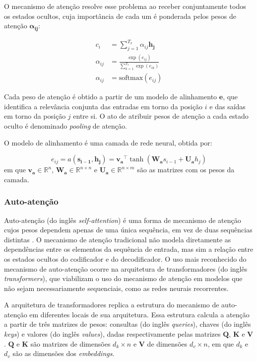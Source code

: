 O mecanismo de atenção \cite{bahdanau2016neural} resolve esse problema ao
receber conjuntamente todos os estados ocultos, cuja importância de cada um é
ponderada pelos pesos de atenção $\mathbf{\alpha_{ij}}$:


\begin{align}
    c_i &= \sum_{j=1}^{T_x} \alpha_{ij} \mathbf{h_j} \\
    \alpha_{ij} &= \frac{\exp(e_{ij})}{\sum_{k=1}^{T_x} \exp(e_{ik})} \\
    \alpha_{ij} &=  \text{softmax}(e_{ij})
\end{align}

Cada peso de atenção é obtido a partir de um modelo de alinhamento $\mathbf{e}$,
que identifica a relevância conjunta das entradas em torno da posição $i$ e das
saídas em torno da posição $j$ entre si. O ato de atribuir pesos de atenção a
cada estado oculto é denominado \textit{pooling} de atenção.

O modelo de alinhamento é uma camada de
rede neural, obtida por:

\begin{equation}
    e_{ij} = a(\mathbf{s_{i-1}}, \mathbf{h_j}) = \mathbf{v_a}^\top \tanh(\mathbf{W_a}s_{i-1} + \mathbf{U_a}h_j)
\end{equation}
em que $\mathbf{v_a} \in \mathbb{R}^n$, $\mathbf{W_a} \in \mathbb{R}^{n \times
n}$ e $\mathbf{U_a} \in \mathbb{R}^{n \times m}$ são as matrizes com os pesos da
camada.

\subsubsection{Auto-atenção}
Auto-atenção (do inglês \textit{self-attention}) é uma forma de mecanismo de
atenção cujos pesos dependem apenas de uma única sequência, em vez de duas
sequências distintas \cite{kim2017structured}. O mecanismo de atenção
tradicional não modela diretamente as dependências entre os elementos da
sequência de entrada, mas sim a relação entre os estados ocultos do codificador
e do decodificador. O uso mais reconhecido do mecanismo de auto-atenção ocorre
na arquitetura de transformadores (do inglês \textit{transformers}), que
viabilizam o uso do mecanismo de atenção em modelos que não sejam
necessariamente sequenciais, como as redes neurais recorrentes.

A arquitetura de transformadores replica a estrutura do mecanismo de
auto-atenção em diferentes locais de sua arquitetura. Essa estrutura calcula a
atenção a partir de três matrizes de pesos: consultas (do inglês
\textit{queries}), chaves (do inglês \textit{keys}) e valores (do inglês
\textit{values}), dadas respectivamente pelas matrizes $\mathbf{Q}$,
$\mathbf{K}$ e $\mathbf{V}$. $\mathbf{Q}$ e $\mathbf{K}$ são matrizes de dimensões $d_k
\times n$ e $\mathbf{V}$ de dimensões $d_v \times n$, em que $d_k$ e $d_v$
são as dimensões dos \textit{embeddings}.


